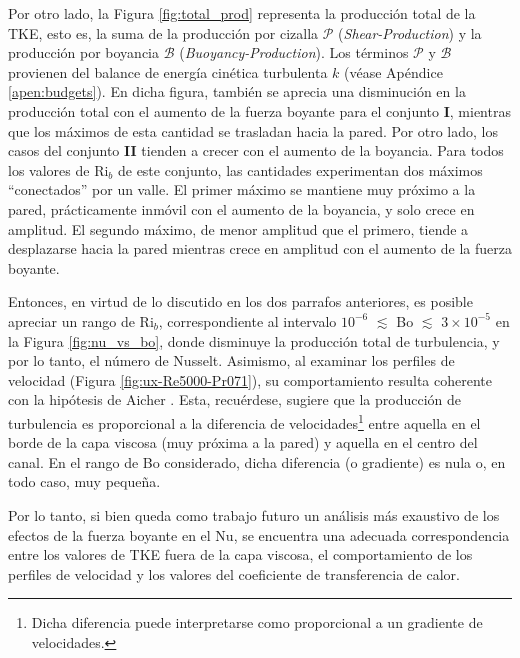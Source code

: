 Por otro lado, la Figura \ref{fig:total_prod} representa la producción total de la TKE, esto es, la suma de la producción por cizalla $\mathcal{P}$ (\textit{Shear-Production}) y la producción por boyancia $\mathcal{B}$ (\textit{Buoyancy-Production}). Los términos $\mathcal{P}$ y $\mathcal{B}$ provienen del balance de energía cinética turbulenta $k$  (véase Apéndice \ref{apen:budgets}). En dicha figura, también se aprecia una disminución en la producción total con el aumento de la fuerza boyante para el conjunto \textbf{I}, mientras que los máximos de esta cantidad se trasladan hacia la pared. Por otro lado, los casos del conjunto \textbf{II} tienden a crecer con el aumento de la boyancia. Para todos los valores de $\text{Ri}_b$ de este conjunto, las cantidades experimentan dos máximos ``conectados'' por un valle. El primer máximo se mantiene muy próximo a la pared, prácticamente inmóvil con el aumento de la boyancia, y solo crece en amplitud. El segundo máximo, de menor amplitud que el primero, tiende a desplazarse hacia la pared mientras crece en amplitud con el aumento de la fuerza boyante.

Entonces, en virtud de lo discutido en los dos parrafos anteriores, es posible apreciar un rango de Ri$_b$, correspondiente al intervalo $10^{-6}$ $\lesssim$ Bo $\lesssim$ $3 \times 10^{-5}$ en la Figura \ref{fig:nu_vs_bo}, donde disminuye la producción total de turbulencia, y por lo tanto, el número de Nusselt. Asimismo, al examinar los perfiles de velocidad (Figura \ref{fig:ux-Re5000-Pr071}), su comportamiento resulta coherente con la hipótesis de Aicher \cite{aicher1997}. Esta, recuérdese, sugiere que la producción de turbulencia es proporcional a la diferencia de velocidades\footnote{Dicha diferencia puede interpretarse como proporcional a un gradiente de velocidades.} entre aquella en el borde de la capa viscosa (muy próxima a la pared) y aquella en el centro del canal. En el rango de Bo considerado, dicha diferencia (o gradiente) es nula o, en todo caso, muy pequeña.

Por lo tanto, si bien queda como trabajo futuro un análisis más exaustivo de los efectos de la fuerza boyante en el Nu, se encuentra una adecuada correspondencia entre los valores de TKE fuera de la capa viscosa, el comportamiento de los perfiles de velocidad y los valores del coeficiente de transferencia de calor.



